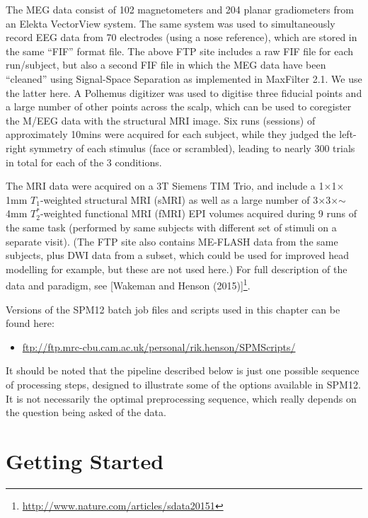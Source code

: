 The MEG data consist of 102 magnetometers and 204 planar gradiometers from an Elekta VectorView system. The same system was used to simultaneously record EEG data from 70 electrodes (using a nose reference), which are stored in the same ``FIF'' format file. The above FTP site includes a raw FIF file for each run/subject, but also a second FIF file in which the MEG data have been ``cleaned'' using Signal-Space Separation as implemented in MaxFilter 2.1. We use the latter here. A Polhemus digitizer was used to digitise three fiducial points and a large number of other points across the scalp, which can be used to coregister the M/EEG data with the structural MRI image. Six runs (sessions) of approximately 10mins were acquired for each subject, while they judged the left-right symmetry of each stimulus (face or scrambled), leading to nearly 300 trials in total for each of the 3 conditions.

The MRI data were acquired on a 3T Siemens TIM Trio, and include a 1\(\times\)1\(\times\)1mm \(T_1\)-weighted structural MRI (sMRI) as well as a large number of 3\(\times\)3\(\times\)\(\sim\)4mm \(T^*_2\)-weighted functional MRI (fMRI) EPI volumes acquired during 9 runs of the same task (performed by same subjects with different set of stimuli on a separate visit). (The FTP site also contains ME-FLASH data from the same subjects, plus DWI data from a subset, which could be used for improved head modelling for example, but these are not used here.) For full description of the data and paradigm, see [Wakeman and Henson (2015)]\footnote{\url{http://www.nature.com/articles/sdata20151}}.

Versions of the SPM12 batch job files and scripts used in this chapter can be found here:

\begin{itemize}
	\item[] \url{ftp://ftp.mrc-cbu.cam.ac.uk/personal/rik.henson/SPMScripts/}
\end{itemize}

It should be noted that the pipeline described below is just one possible sequence of processing steps, designed to illustrate some of the options available in SPM12. It is not necessarily the optimal preprocessing sequence, which really depends on the question being asked of the data.

\section{Getting Started}

